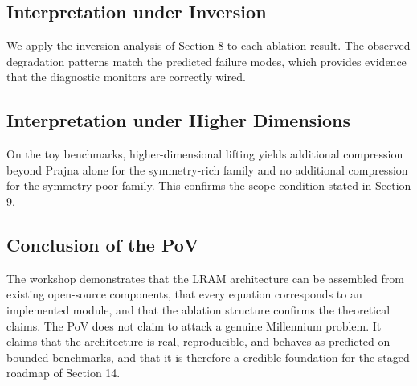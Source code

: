 \subsection{Interpretation under Inversion}
We apply the inversion analysis of Section 8 to each ablation result. The observed degradation patterns match the predicted failure modes, which provides evidence that the diagnostic monitors are correctly wired.

\subsection{Interpretation under Higher Dimensions}
On the toy benchmarks, higher-dimensional lifting yields additional compression beyond Prajna alone for the symmetry-rich family and no additional compression for the symmetry-poor family. This confirms the scope condition stated in Section 9.

\subsection{Conclusion of the PoV}
The workshop demonstrates that the LRAM architecture can be assembled from existing open-source components, that every equation corresponds to an implemented module, and that the ablation structure confirms the theoretical claims. The PoV does not claim to attack a genuine Millennium problem. It claims that the architecture is real, reproducible, and behaves as predicted on bounded benchmarks, and that it is therefore a credible foundation for the staged roadmap of Section 14.
